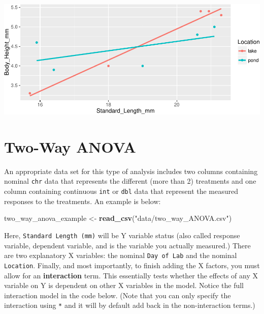 \documentclass[twoside, 12pt]{article}
\newenvironment{Shaded}{\begin{snugshade}}{\end{snugshade}}
\newcommand{\KeywordTok}[1]{\textcolor[rgb]{0.13,0.29,0.53}{\textbf{{#1}}}}
\newcommand{\DataTypeTok}[1]{\textcolor[rgb]{0.13,0.29,0.53}{{#1}}}
\newcommand{\StringTok}[1]{\textcolor[rgb]{0.31,0.60,0.02}{{#1}}}
\newcommand{\OtherTok}[1]{\textcolor[rgb]{0.56,0.35,0.01}{{#1}}}
\newcommand{\NormalTok}[1]{{#1}}
\begin{document}
\begin{Shaded}
\end{Shaded}

\includegraphics{skeleton_files/figure-latex/unnamed-chunk-38-1.pdf}

\section{Two-Way ANOVA}\label{two-way-anova}

An appropriate data set for this type of analysis includes two columns
containing nominal \texttt{chr} data that represents the different (more
than 2) treatments and one column containing continuous \texttt{int} or
\texttt{dbl} data that represent the measured responses to the
treatments. An example is below:

\begin{Shaded}
\begin{Highlighting}[]
\NormalTok{two_way_anova_example <-}\StringTok{ }\KeywordTok{read_csv}\NormalTok{(}\StringTok{"data/two_way_ANOVA.csv"}\NormalTok{)}
\end{Highlighting}
\end{Shaded}

Here, \texttt{Standard\ Length\ (mm)} will be Y variable status (also
called response variable, dependent variable, and is the variable you
actually measured.) There are two explanatory X variables: the nominal
\texttt{Day\ of\ Lab} and the nominal \texttt{Location}. Finally, and
most importantly, to finish adding the X factors, you must allow for an
\textbf{interaction} term. This essentially tests whether the effects of
any X variable on Y is dependent on other X variables in the model.
Notice the full interaction model in the code below. (Note that you can
only specify the interaction using \texttt{*} and it will by default add
back in the non-interaction terms.)
\end{document}
